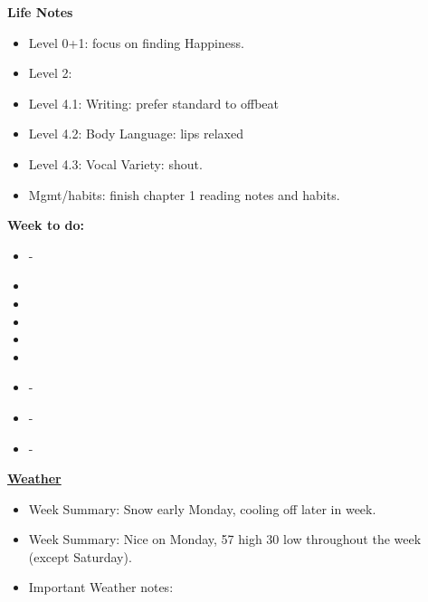 \documentclass[11pt]{article}
\begin{document}
{            %
            \textbf{Life Notes}
            \begin{itemize}
              \tiny \item \tiny Level 0+1: focus on finding Happiness.
            \item \tiny Level 2:
            \item \tiny Level 4.1: Writing: prefer standard to offbeat
            \item \tiny Level 4.2: Body Language: lips relaxed
            \item \tiny Level 4.3: Vocal Variety: shout.
            \item \tiny Mgmt/habits: finish chapter 1 reading notes and habits.
            \end{itemize} 
            \newpage
            \textbf{Week to do:} 
            \begin{itemize}
              \small \item \small - 
            \item \small
            \item \small
            \item \small
            \item \small
            \item \small
            \item \small - 
            \item \small - 
            \item \small - 
            \end{itemize} 
            \newpage 
         
            \textbf{\small \underline{Weather}} 
            \begin{itemize} 
              \tiny \item \tiny Week Summary: Snow early Monday,
              cooling off later in week. 
              \tiny \item \tiny Week Summary: Nice on Monday, 57 high
              30 low throughout the week (except Saturday). 
            \item \tiny Important Weather notes:  
            \end{itemize} 

}
\end{document}
